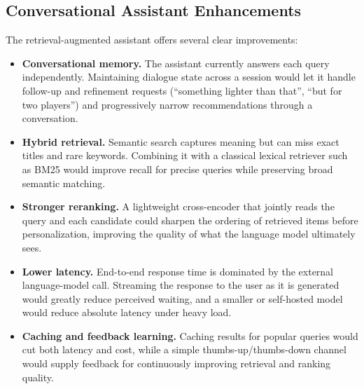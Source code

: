 \subsection{Conversational Assistant Enhancements}
The retrieval-augmented assistant offers several clear improvements:
\begin{itemize}
    \item \textbf{Conversational memory.} The assistant currently answers each query independently. Maintaining dialogue state across a session would let it handle follow-up and refinement requests (``something lighter than that'', ``but for two players'') and progressively narrow recommendations through a conversation.
    \item \textbf{Hybrid retrieval.} Semantic search captures meaning but can miss exact titles and rare keywords. Combining it with a classical lexical retriever such as BM25 \cite{robertson2009bm25} would improve recall for precise queries while preserving broad semantic matching.
    \item \textbf{Stronger reranking.} A lightweight cross-encoder that jointly reads the query and each candidate \cite{nogueira2019passage} could sharpen the ordering of retrieved items before personalization, improving the quality of what the language model ultimately sees.
    \item \textbf{Lower latency.} End-to-end response time is dominated by the external language-model call. Streaming the response to the user as it is generated would greatly reduce perceived waiting, and a smaller or self-hosted model would reduce absolute latency under heavy load.
    \item \textbf{Caching and feedback learning.} Caching results for popular queries would cut both latency and cost, while a simple thumbs-up/thumbs-down channel would supply feedback for continuously improving retrieval and ranking quality.
\end{itemize}

